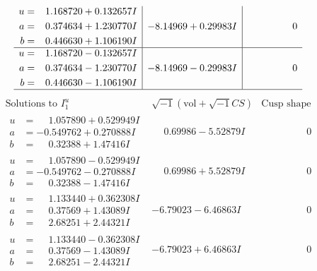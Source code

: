 \documentclass[1p]{elsarticle_modified}
\theoremstyle{definition}
\newcommand{\I}{\sqrt{-1}}
\begin{document}
$$\begin{array}{c|c|c}
\begin{aligned}
u &= \phantom{-}1.168720 + 0.132657 I \\
a &= \phantom{-}0.374634 + 1.230770 I \\
b &= \phantom{-}0.446630 + 1.106190 I\end{aligned}
 & -8.14969 + 0.29983 I & \phantom{-0.000000 } 0 \\ \hline\begin{aligned}
u &= \phantom{-}1.168720 - 0.132657 I \\
a &= \phantom{-}0.374634 - 1.230770 I \\
b &= \phantom{-}0.446630 - 1.106190 I\end{aligned}
 & -8.14969 - 0.29983 I & \phantom{-0.000000 } 0\\
 \hline 
 \end{array}$$\newpage$$\begin{array}{c|c|c}  
\text{Solutions to }I^u_{1}& \I (\text{vol} + \sqrt{-1}CS) & \text{Cusp shape}\\
 \hline 
\begin{aligned}
u &= \phantom{-}1.057890 + 0.529949 I \\
a &= -0.549762 + 0.270888 I \\
b &= \phantom{-}0.32388 + 1.47416 I\end{aligned}
 & \phantom{-}0.69986 - 5.52879 I & \phantom{-0.000000 } 0 \\ \hline\begin{aligned}
u &= \phantom{-}1.057890 - 0.529949 I \\
a &= -0.549762 - 0.270888 I \\
b &= \phantom{-}0.32388 - 1.47416 I\end{aligned}
 & \phantom{-}0.69986 + 5.52879 I & \phantom{-0.000000 } 0 \\ \hline\begin{aligned}
u &= \phantom{-}1.133440 + 0.362308 I \\
a &= \phantom{-}0.37569 + 1.43089 I \\
b &= \phantom{-}2.68251 + 2.44321 I\end{aligned}
 & -6.79023 - 6.46863 I & \phantom{-0.000000 } 0 \\ \hline\begin{aligned}
u &= \phantom{-}1.133440 - 0.362308 I \\
a &= \phantom{-}0.37569 - 1.43089 I \\
b &= \phantom{-}2.68251 - 2.44321 I\end{aligned}
 & -6.79023 + 6.46863 I & \phantom{-0.000000 } 0 \\ \hline\begin{aligned}

\end{aligned}
\end{array}$$
\end{document}
